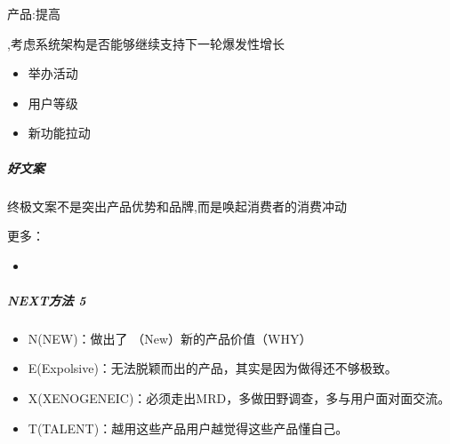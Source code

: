 \documentclass[letterpaper,10pt,english]{sphinxmanual}
\begin{document}
产品:提高%
\begin{footnote}[469]\sphinxAtStartFootnote
{}
%
\end{footnote},考虑系统架构是否能够继续支持下一轮爆发性增长
\begin{itemize}
\item {} 
举办活动

\item {} 
用户等级

\item {} 
新功能拉动
%
\begin{footnote}[470]\sphinxAtStartFootnote
{}
%
\end{footnote}

\end{itemize}


\subparagraph{好文案}
\label{\detokenize{chapter_idea/GTM:id13}}
终极文案不是突出产品优势和品牌,而是唤起消费者的消费冲动

更多：
\begin{itemize}
\item {} 

\end{itemize}


\subparagraph{NEXT方法 5\sphinxfootnotemark[471]}
\label{\detokenize{chapter_idea/GTM:next-5}}%
\begin{footnotetext}[471]\sphinxAtStartFootnote
{}
%
\end{footnotetext}\ignorespaces \begin{itemize}
\item {} 
N(NEW)：做出了 （New）新的产品价值（WHY）

\item {} 
E(Expolsive)：无法脱颖而出的产品，其实是因为做得还不够极致。

\item {} 
X(XENOGENEIC)：必须走出MRD，多做田野调查，多与用户面对面交流。

\item {} 
T(TALENT)：越用这些产品用户越觉得这些产品懂自己。

\end{itemize}
\end{document}
